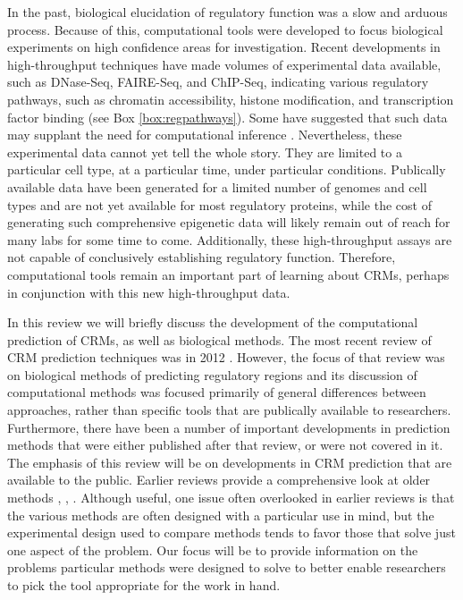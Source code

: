 \documentclass{frontiersENG} %
\begin{document}
In the past, biological elucidation of regulatory function was a slow
and arduous process. Because of this, computational tools were
developed to focus biological experiments on high confidence areas for
investigation. Recent developments in high-throughput techniques have
made volumes of experimental data available, such as DNase-Seq,
FAIRE-Seq, and ChIP-Seq, indicating various regulatory pathways, such
as chromatin accessibility, histone modification, and transcription
factor binding (see Box \ref{box:regpathways}). Some have suggested
that such data may supplant the need for computational inference
\cite{Hardison2012}. Nevertheless, these experimental data cannot yet
tell the whole story. They are limited to a particular cell type, at a
particular time, under particular conditions. Publically available
data have been generated for a limited number of genomes and cell
types and are not yet available for most regulatory proteins, while
the cost of generating such comprehensive epigenetic data will likely
remain out of reach for many labs for some time to come. Additionally,
these high-throughput assays are not capable of conclusively
establishing regulatory function. Therefore, computational tools
remain an important part of learning about CRMs, perhaps in
conjunction with this new high-throughput data.

In this review we will briefly discuss the development of the
computational prediction of CRMs, as well as biological methods. The
most recent review of CRM prediction techniques was in 2012
\cite{Hardison2012}. However, the focus of that review was on
biological methods of predicting regulatory regions and its discussion
of computational methods was focused primarily of general differences
between approaches, rather than specific tools that are publically
available to researchers. Furthermore, there have been a number of
important developments in prediction methods that were either
published after that review, or were not covered in it. The emphasis
of this review will be on developments in CRM prediction that are
available to the public. Earlier reviews provide a comprehensive look
at older methods \cite{Elnitski2006}, \cite{Loo2009},
\cite{Su2010}. Although useful, one issue often overlooked in earlier
reviews is that the various methods are often designed with a
particular use in mind, but the experimental design used to compare
methods tends to favor those that solve just one aspect of the
problem. Our focus will be to provide information on the problems
particular methods were designed to solve to better enable researchers
to pick the tool appropriate for the work in hand.
\end{document}
